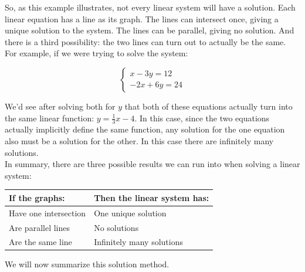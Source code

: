 \bigskip

So, as this example illustrates, not every linear system will have a solution. Each linear equation has a line as its graph. The lines can intersect once, giving a unique solution to the system. The lines can be parallel, giving no solution. And there is a third possibility: the two lines can turn out to actually be the same. For example, if we were trying to solve the system:

$$\begin{cases} x-3y=12\\-2x+6y=24 \end{cases}$$

We’d see after solving both for $y$ that both of these equations actually turn into the same linear function: $y=\frac{1}{3}x-4$. In this case, since the two equations actually implicitly define the same function, any solution for the one equation also must be a solution for the other. In this case there are infinitely many solutions.\\

In summary, there are three possible results we can run into when solving a linear system:

\begin{center}
	\begin{tabular}{|l|l|}
		\hline
		If the graphs: & Then the linear system has:\\
		\hline
		Have one intersection & One unique solution\\
		\hline
		Are parallel lines & No solutions\\
		\hline
		Are the same line & Infinitely many solutions\\
		\hline
	\end{tabular}
\end{center}

We will now summarize this solution method.

